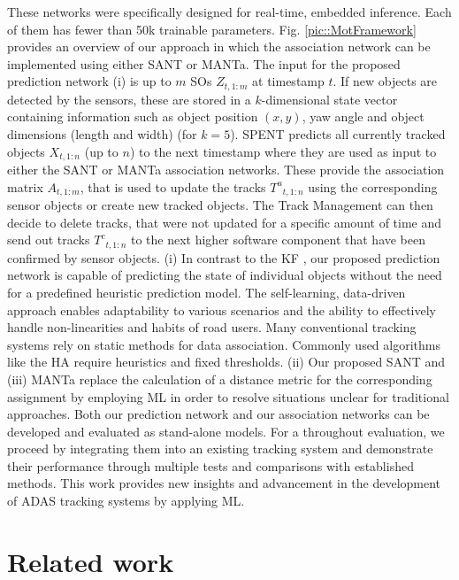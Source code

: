 \documentclass[letterpaper, 10 pt, journal, twoside]{IEEEtran}
\begin{document}
These networks were specifically designed for real-time, embedded inference. Each of them has fewer than 50k trainable parameters. Fig. {\ref{pic::MotFramework}} provides an overview of our approach in which the association network can be implemented using either \ac{SANT} or \ac{MANTa}.
The input for the proposed prediction network (i) is up to $m$ \acp{SO} $Z_{t,1:m}$ at timestamp $t$.
If new objects are detected by the sensors, these are stored in a $k$-dimensional state vector containing information such as object position $(x,y)$, yaw angle and object dimensions
(length and width) (for $k=5$).
\ac{SPENT} predicts all currently tracked objects $X_{t,1:n}$ (up to $n$) to the next timestamp where they are used as input to either the SANT or MANTa association networks.
These provide the association matrix $A_{t,1:m}$, that is used to update the tracks ${T^u}_{t,1:n}$ using the corresponding sensor objects or create new tracked objects.
The Track Management can then decide to delete tracks, that were not updated for a specific amount of time and send out tracks ${T^c}_{t,1:n}$ to the next higher software component that have been confirmed by sensor objects.
(i) In contrast to the \ac{KF} {\cite{KF_BoundingBD.2023}}, our proposed prediction network is capable of predicting the state of individual objects without the need for a predefined heuristic prediction model. %
The self-learning, data-driven approach enables adaptability to various scenarios and the ability to effectively handle non-linearities and habits of road users.
Many conventional tracking systems rely on static methods for data association.
Commonly used algorithms like the \ac{HA} {\cite{DA_hungarian.1955}} require heuristics and fixed thresholds.
(ii) Our proposed \ac{SANT} and (iii) \ac{MANTa} replace the calculation of a distance metric for the corresponding assignment by employing \ac{ML} in order to resolve situations unclear for traditional approaches.
Both our prediction network and our association networks can be developed and evaluated as stand-alone models.
For a throughout evaluation, we proceed by integrating them into an existing tracking system and demonstrate their performance through multiple tests and comparisons with established methods.
This work provides new insights and advancement in the development of \ac{ADAS} tracking systems by applying \ac{ML}\@.

\section{Related work}
\end{document}
